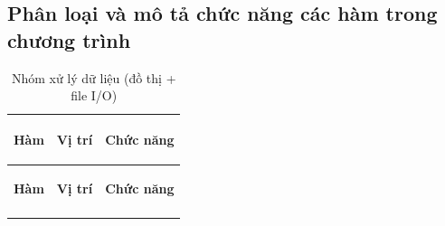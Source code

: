 \documentclass[14pt,a4paper]{report}
\begin{document}
\subsection{Phân loại và mô tả chức năng các hàm trong chương trình}

\renewcommand{\arraystretch}{1.15}
\setlength{\tabcolsep}{6pt}

\begin{longtable}{|>{\bfseries\raggedright\arraybackslash}p{}|
                   >{\bfseries\raggedright\arraybackslash}p{2.8cm}|
                   >{\raggedright\arraybackslash}p{}|}
\caption{Nhóm xử lý dữ liệu (đồ thị + file I/O)}\\
\hline
\rowcolor{headergray}
\color{white}\textbf{Hàm} & \color{white}\textbf{Vị trí} & \color{white}\textbf{Chức năng} \\
\hline
\endfirsthead

\hline
\rowcolor{headergray}
\color{white}\textbf{Hàm} & \color{white}\textbf{Vị trí} & \color{white}\textbf{Chức năng} \\
\hline
\endhead

\hline
\endfoot

\hline
\endlastfoot


\end{longtable}
\end{document}
